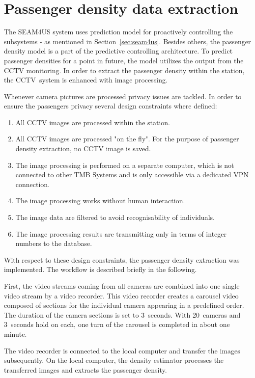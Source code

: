 \section{Passenger density data extraction}
\label{sec:PassengerDensityDataExtraction}

The SEAM4US system uses prediction model for proactively controlling the subsystems - as mentioned in Section~\ref{sec:seam4us}. Besides others, the passenger density model is a part of the predictive controlling architecture.
To predict passenger densities for a point in future, the model utilizes the output from the CCTV monitoring. In order to extract the passenger density within the station, the CCTV~system is enhanced with image processing.

Whenever camera pictures are processed privacy issues are tackled. In order to ensure the passengers privacy several design constraints where defined:

\begin{enumerate}
  \item All CCTV images are processed within the station.
  \item All CCTV images are processed "on the fly". For the purpose of passenger density extraction, no CCTV image is saved.
  \item The image processing is performed on a separate computer, which is not connected to other TMB Systems and is only accessible via a dedicated VPN connection.
  \item The image processing works without human interaction.
  \item The image data are filtered to avoid recognisability of individuals.
  \item The image processing results are transmitting only in terms of integer numbers to the database.
\end{enumerate}

With respect to these design constraints, the passenger density extraction was implemented. The workflow is described briefly in the following.

First, the video streams coming from all cameras are combined into one single video stream by a video recorder. This video recorder creates a carousel video composed of sections for the individual camera appearing in a predefined order. The duration of the camera sections is set to 3~seconds. With 20~cameras and 3~seconds hold on each, one turn of the carousel is completed in about one minute.

The video recorder is connected to the local computer and transfer the images subsequently. On the local computer, the density estimator processes the transferred images and extracts the passenger density.

